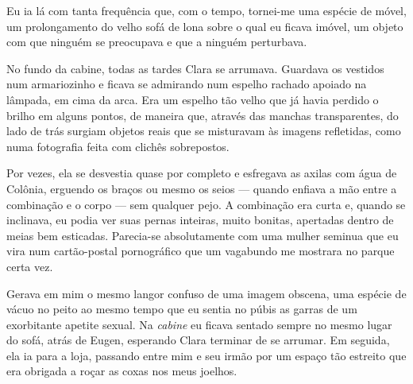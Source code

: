 


Eu ia lá com tanta frequência que, com o tempo, tornei-me uma espécie de
móvel, um prolongamento do velho sofá de lona sobre o qual eu ficava imóvel,
um objeto com que ninguém se preocupava e que a ninguém perturbava.

No fundo da cabine, todas as tardes Clara se arrumava. Guardava os vestidos
num armariozinho e ficava se admirando num espelho rachado apoiado na
lâmpada, em cima da arca. Era um espelho tão velho que já havia perdido o
brilho em alguns pontos, de maneira que, através das manchas transparentes,
do lado de trás surgiam objetos reais que se misturavam às imagens
refletidas, como numa fotografia feita com clichês sobrepostos.

Por vezes, ela se desvestia quase por completo e esfregava as axilas com água
de Colônia, erguendo os braços ou mesmo os seios --- quando enfiava a mão
entre a combinação e o corpo --- sem qualquer pejo. A combinação era curta e,
quando se inclinava, eu podia ver suas pernas inteiras, muito bonitas,
apertadas dentro de meias bem esticadas. Parecia-se absolutamente com uma
mulher seminua que eu vira num cartão-postal pornográfico que um vagabundo me
mostrara no parque certa vez.

Gerava em mim o mesmo langor confuso de uma imagem obscena, uma espécie de
vácuo no peito ao mesmo tempo que eu sentia no púbis as garras de um
exorbitante apetite sexual. Na \textit{cabine} eu ficava sentado sempre no
mesmo lugar do sofá, atrás de Eugen, esperando Clara terminar de se arrumar.
Em seguida, ela ia para a loja, passando entre mim e seu irmão por um espaço
tão estreito que era obrigada a roçar as coxas nos meus joelhos.

